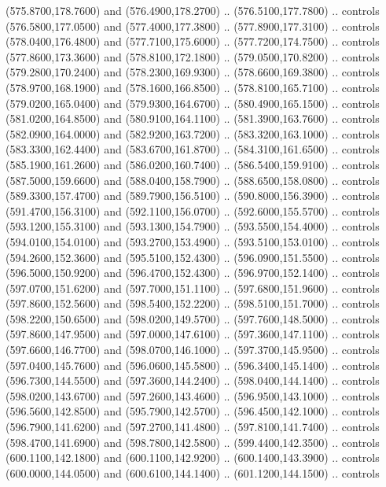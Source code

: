 {\begin{scope}[y=0.80pt, x=0.80pt, yscale=-1, xscale=1, inner sep=0pt, outer sep=0pt, #1]
      (575.8700,178.7600) and (576.4900,178.2700) .. (576.5100,177.7800) .. controls
      (576.5800,177.0500) and (577.4000,177.3800) .. (577.8900,177.3100) .. controls
      (578.0400,176.4800) and (577.7100,175.6000) .. (577.7200,174.7500) .. controls
      (577.8600,173.3600) and (578.8100,172.1800) .. (579.0500,170.8200) .. controls
      (579.2800,170.2400) and (578.2300,169.9300) .. (578.6600,169.3800) .. controls
      (578.9700,168.1900) and (578.1600,166.8500) .. (578.8100,165.7100) .. controls
      (579.0200,165.0400) and (579.9300,164.6700) .. (580.4900,165.1500) .. controls
      (581.0200,164.8500) and (580.9100,164.1100) .. (581.3900,163.7600) .. controls
      (582.0900,164.0000) and (582.9200,163.7200) .. (583.3200,163.1000) .. controls
      (583.3300,162.4400) and (583.6700,161.8700) .. (584.3100,161.6500) .. controls
      (585.1900,161.2600) and (586.0200,160.7400) .. (586.5400,159.9100) .. controls
      (587.5000,159.6600) and (588.0400,158.7900) .. (588.6500,158.0800) .. controls
      (589.3300,157.4700) and (589.7900,156.5100) .. (590.8000,156.3900) .. controls
      (591.4700,156.3100) and (592.1100,156.0700) .. (592.6000,155.5700) .. controls
      (593.1200,155.3100) and (593.1300,154.7900) .. (593.5500,154.4000) .. controls
      (594.0100,154.0100) and (593.2700,153.4900) .. (593.5100,153.0100) .. controls
      (594.2600,152.3600) and (595.5100,152.4300) .. (596.0900,151.5500) .. controls
      (596.5000,150.9200) and (596.4700,152.4300) .. (596.9700,152.1400) .. controls
      (597.0700,151.6200) and (597.7000,151.1100) .. (597.6800,151.9600) .. controls
      (597.8600,152.5600) and (598.5400,152.2200) .. (598.5100,151.7000) .. controls
      (598.2200,150.6500) and (598.0200,149.5700) .. (597.7600,148.5000) .. controls
      (597.8600,147.9500) and (597.0000,147.6100) .. (597.3600,147.1100) .. controls
      (597.6600,146.7700) and (598.0700,146.1000) .. (597.3700,145.9500) .. controls
      (597.0400,145.7600) and (596.0600,145.5800) .. (596.3400,145.1400) .. controls
      (596.7300,144.5500) and (597.3600,144.2400) .. (598.0400,144.1400) .. controls
      (598.0200,143.6700) and (597.2600,143.4600) .. (596.9500,143.1000) .. controls
      (596.5600,142.8500) and (595.7900,142.5700) .. (596.4500,142.1000) .. controls
      (596.7900,141.6200) and (597.2700,141.4800) .. (597.8100,141.7400) .. controls
      (598.4700,141.6900) and (598.7800,142.5800) .. (599.4400,142.3500) .. controls
      (600.1100,142.1800) and (600.1100,142.9200) .. (600.1400,143.3900) .. controls
      (600.0000,144.0500) and (600.6100,144.1400) .. (601.1200,144.1500) .. controls

\end{scope}}
